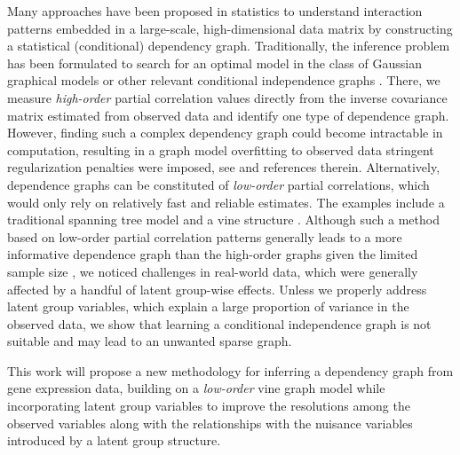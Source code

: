 \documentclass[a4paper]{article}
\begin{document}
Many approaches have been proposed in statistics to understand interaction patterns embedded in a large-scale, high-dimensional data matrix by constructing a statistical (conditional) dependency graph. Traditionally, the inference problem has been formulated to search for an optimal model in the class of Gaussian graphical models or other relevant conditional independence graphs \cite{Whittaker1990}. There, we measure \emph{high-order} partial correlation values directly from the inverse covariance matrix estimated from observed data and identify one type of dependence graph. However, finding such a complex dependency graph could become intractable in computation, resulting in a graph model overfitting to observed data stringent regularization penalties were imposed, see \cite{lin2016estimation} and references therein. Alternatively, dependence graphs can be constituted of \emph{low-order} partial correlations, which would only rely on relatively fast and reliable estimates. The examples include a traditional spanning tree model \citep{chow1968approximating} and a vine structure \citep{kurowicka2003parameterization}. Although such a method based on low-order partial correlation patterns generally leads to a more informative dependence graph than the high-order graphs given the limited sample size \citep{magwene2004estimating}, we noticed challenges in real-world data, which were generally affected by a handful of latent group-wise effects. Unless we properly address latent group variables, which explain a large proportion of variance in the observed data, we show that learning a conditional independence graph is not suitable and may lead to an unwanted sparse graph.


This work will propose a new methodology for inferring a dependency graph from gene expression data, building on a \emph{low-order} vine graph model \citep{kurowicka2003parameterization} while incorporating latent group variables to improve the resolutions among the observed variables along with the relationships with the nuisance variables introduced by a latent group structure. 




\end{document}
